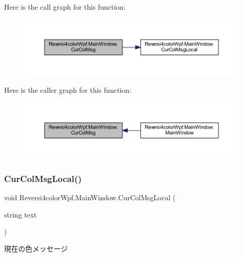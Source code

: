 Here is the call graph for this function\+:
\nopagebreak
\begin{figure}[H]
\begin{center}
\leavevmode
\includegraphics[width=350pt]{class_reversi4color_wpf_1_1_main_window_ab2c7405df589c397f20edfd497f8b055_cgraph}
\end{center}
\end{figure}
Here is the caller graph for this function\+:
\nopagebreak
\begin{figure}[H]
\begin{center}
\leavevmode
\includegraphics[width=350pt]{class_reversi4color_wpf_1_1_main_window_ab2c7405df589c397f20edfd497f8b055_icgraph}
\end{center}
\end{figure}
\mbox{\label{class_reversi4color_wpf_1_1_main_window_a95f83a9cd4af4893c6fe2b84d717b92c}} 
\subsubsection{\texorpdfstring{Cur\+Col\+Msg\+Local()}{CurColMsgLocal()}}
{\footnotesize\ttfamily void Reversi4color\+Wpf.\+Main\+Window.\+Cur\+Col\+Msg\+Local (\begin{DoxyParamCaption}\item[{string}]{text }\end{DoxyParamCaption})}



現在の色メッセージ 


